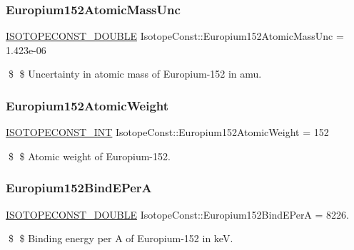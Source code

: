 \subsubsection{\texorpdfstring{Europium152\+Atomic\+Mass\+Unc}{Europium152AtomicMassUnc}}
{\footnotesize\ttfamily \mbox{\hyperlink{group___isotope_const-_macros_ga8f45a7272ce02c0b4c65c44636ed719a}{I\+S\+O\+T\+O\+P\+E\+C\+O\+N\+S\+T\+\_\+\+D\+O\+U\+B\+LE}} Isotope\+Const\+::\+Europium152\+Atomic\+Mass\+Unc = 1.\+423e-\/06}

\$ \$ Uncertainty in atomic mass of Europium-\/152 in amu. \mbox{\label{group___isotope_const-_europium-_eu152_ga62bb32a67ae51a5417da5ce61074bbea}} 
\subsubsection{\texorpdfstring{Europium152\+Atomic\+Weight}{Europium152AtomicWeight}}
{\footnotesize\ttfamily \mbox{\hyperlink{group___isotope_const-_macros_ga5f18360b3e99483a35c32d789e62621c}{I\+S\+O\+T\+O\+P\+E\+C\+O\+N\+S\+T\+\_\+\+I\+NT}} Isotope\+Const\+::\+Europium152\+Atomic\+Weight = 152}

\$ \$ Atomic weight of Europium-\/152. \mbox{\label{group___isotope_const-_europium-_eu152_ga97171d5547a961208e4f428b455a86f5}} 
\subsubsection{\texorpdfstring{Europium152\+Bind\+E\+PerA}{Europium152BindEPerA}}
{\footnotesize\ttfamily \mbox{\hyperlink{group___isotope_const-_macros_ga8f45a7272ce02c0b4c65c44636ed719a}{I\+S\+O\+T\+O\+P\+E\+C\+O\+N\+S\+T\+\_\+\+D\+O\+U\+B\+LE}} Isotope\+Const\+::\+Europium152\+Bind\+E\+PerA = 8226.}

\$ \$ Binding energy per A of Europium-\/152 in keV. \mbox{\label{group___isotope_const-_europium-_eu152_ga5db7e6a628b02c902bafe7b113495433}} 
